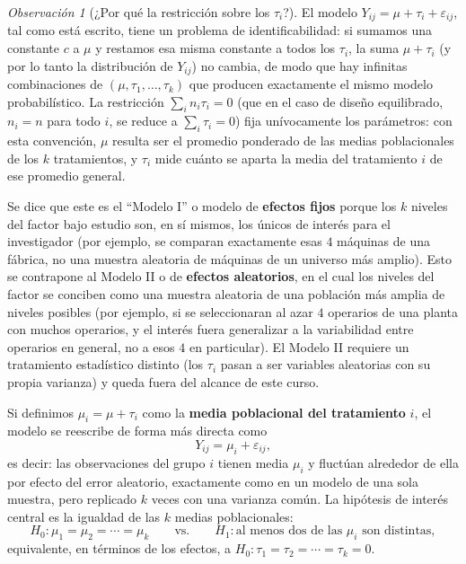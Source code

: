 \documentclass[11pt,a4paper]{article}
\theoremstyle{plain}
\theoremstyle{definition}
\theoremstyle{remark}
\newtheorem{observacion}[teorema]{Observación}
\begin{document}
\begin{observacion}[¿Por qué la restricción sobre los $\tau_i$?]
El modelo $Y_{ij}=\mu+\tau_i+\varepsilon_{ij}$, tal como está escrito, tiene un problema de identificabilidad: si sumamos una constante $c$ a $\mu$ y restamos esa misma constante a todos los $\tau_i$, la suma $\mu+\tau_i$ (y por lo tanto la distribución de $Y_{ij}$) no cambia, de modo que hay infinitas combinaciones de $(\mu,\tau_1,\dots,\tau_k)$ que producen exactamente el mismo modelo probabilístico. La restricción $\sum_in_i\tau_i=0$ (que en el caso de diseño equilibrado, $n_i=n$ para todo $i$, se reduce a $\sum_i\tau_i=0$) fija unívocamente los parámetros: con esta convención, $\mu$ resulta ser el promedio ponderado de las medias poblacionales de los $k$ tratamientos, y $\tau_i$ mide cuánto se aparta la media del tratamiento $i$ de ese promedio general.
\end{observacion}

Se dice que este es el ``Modelo I'' o modelo de \textbf{efectos fijos} porque los $k$ niveles del factor bajo estudio son, en sí mismos, los únicos de interés para el investigador (por ejemplo, se comparan exactamente esas $4$ máquinas de una fábrica, no una muestra aleatoria de máquinas de un universo más amplio). Esto se contrapone al Modelo II o de \textbf{efectos aleatorios}, en el cual los niveles del factor se conciben como una muestra aleatoria de una población más amplia de niveles posibles (por ejemplo, si se seleccionaran al azar $4$ operarios de una planta con muchos operarios, y el interés fuera generalizar a la variabilidad entre operarios en general, no a esos $4$ en particular). El Modelo II requiere un tratamiento estadístico distinto (los $\tau_i$ pasan a ser variables aleatorias con su propia varianza) y queda fuera del alcance de este curso.

Si definimos $\mu_i=\mu+\tau_i$ como la \textbf{media poblacional del tratamiento} $i$, el modelo se reescribe de forma más directa como
\[
Y_{ij} = \mu_i+\varepsilon_{ij},
\]
es decir: las observaciones del grupo $i$ tienen media $\mu_i$ y fluctúan alrededor de ella por efecto del error aleatorio, exactamente como en un modelo de una sola muestra, pero replicado $k$ veces con una varianza común. La hipótesis de interés central es la igualdad de las $k$ medias poblacionales:
\[
H_0: \mu_1=\mu_2=\cdots=\mu_k \qquad \text{vs.} \qquad H_1: \text{al menos dos de las } \mu_i \text{ son distintas},
\]
equivalente, en términos de los efectos, a $H_0:\tau_1=\tau_2=\cdots=\tau_k=0$.
\end{document}
